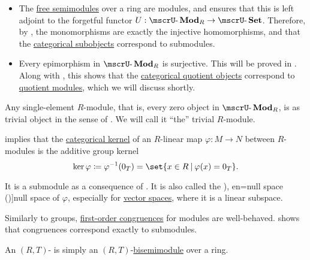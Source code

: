 \begin{definition}
\begin{thmenum}
\begin{itemize}
      \item The \hyperref[def:free_semimodule]{free semimodules} over a ring are modules, and  ensures that this is left adjoint to the forgetful functor \( U: \ucat{Mod}_R \to \ucat{Set} \). Therefore, by , the monomorphisms are exactly the injective homomorphisms, and that the \hyperref[def:subobject_and_quotient]{categorical subobjects} correspond to submodules.

      \item Every epimorphism in \( \ucat{Mod}_R \) is surjective. This will be proved in . Along with , this shows that the \hyperref[def:subobject_and_quotient]{categorical quotient objects} correspond to \hyperref[def:module/quotient]{quotient modules}, which we will discuss shortly.
    \end{itemize}

    \mimprovised Any single-element \( R \)-module, that is, every zero object in \( \ucat{Mod}_R \), is as trivial object in the sense of . We will call it \enquote{the} trivial \( R \)-module.

    \mimprovised {} implies that the \hyperref[def:zero_morphisms/kernel]{categorical kernel} of an \( R \)-linear map \( \varphi: M \to N \) between \( R \)-modules is the additive group kernel
    \begin{equation*}
      \ker \varphi \coloneqq \varphi^{-1}(0_T) = \set{ x \in R \given \varphi(x) = 0_T }.
    \end{equation*}

    It is a submodule as a consequence of . It is also called the \term[ru=нуль-пространство (матрицы) (\cite[112]{Тыртышников2007ЛинейнаяАлгебра}), en=null space (\cite[67]{FriedbergInselSpence2018LinearAlgebra})]{null space} of \( \varphi \), especially for \hyperref[def:vector_space]{vector spaces}, where it is a linear subspace.

    \mimprovised Similarly to groups, \hyperref[def:first_order_congruence]{first-order congruences} for modules are well-behaved.  shows that congruences correspond exactly to submodules.

    \mimprovised An \( (R, T) \)- is simply an \( (R, T) \)-\hyperref[def:semimodule/bisemimodule]{bisemimodule} over a ring.
  \end{thmenum}
\end{definition}


